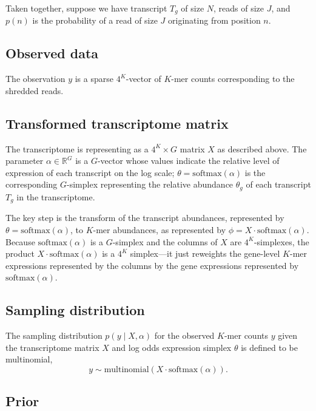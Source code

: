 \documentclass[11pt]{article}
\begin{document}
Taken together, suppose we have transcript $T_g$ of size $N$, reads
of size $J$, and $p(n)$ is the probability of a read of size $J$
originating from position $n$.



\subsection{Observed data}

The observation $y$ is a sparse $4^K$-vector of $K$-mer counts
corresponding to the shredded reads.

\subsection{Transformed transcriptome matrix}

The transcriptome is representing as a $4^K \times G$ matrix $X$ as
described above.  The parameter $\alpha \in \mathbb{R}^G$ is a
$G$-vector whose values indicate the relative level of expression of
each transcript on the log scale; $\theta = \textrm{softmax}(\alpha)$
is the corresponding $G$-simplex representing the relative abundance
$\theta_g$ of each transcript $T_g$ in the transcriptome.

The key step is the transform of the transcript abundances,
represented by $\theta = \textrm{softmax}(\alpha)$, to $K$-mer
abundances, as represented by
$\phi = X \cdot \textrm{softmax}(\alpha)$.  Because
$\textrm{softmax}(\alpha)$ is a $G$-simplex and the columns of $X$ are
$4^K$-simplexes, the product $X \cdot \textrm{softmax}(\alpha)$ is a
$4^K$ simplex---it just reweights the gene-level $K$-mer expressions
represented by the columns by the gene expressions represented by
$\textrm{softmax}(\alpha)$.

\subsection{Sampling distribution}

The sampling distribution $p(y \mid X, \alpha)$  for the observed
$K$-mer counts $y$ given the transcriptome matrix $X$ and log odds
expression simplex $\theta$ is defined to be multinomial,
\[
  y \sim \textrm{multinomial}(X \cdot \textrm{softmax}(\alpha)).
\]


\subsection{Prior}
\end{document}

